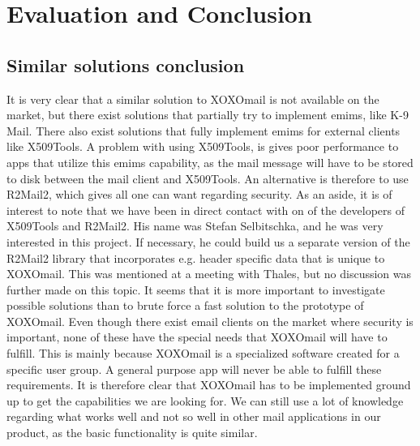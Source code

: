 \section{Evaluation and Conclusion}

\subsection{Similar solutions conclusion}
It is very clear that a similar solution to XOXOmail is not available on the market, but there exist solutions that partially try to implement \gls{emims}, like K-9 Mail. There also exist solutions that fully implement \gls{emims} for external clients like X509Tools. A problem with using X509Tools, is gives poor performance to apps that utilize this \gls{emims} capability, as the mail message will have to be stored to disk between the mail client and X509Tools. An alternative is therefore to use R2Mail2, which gives all one can want regarding security.
\newline
\newline
As an aside, it is of interest to note that we have been in direct contact with on of the developers of X509Tools and R2Mail2. His name was Stefan Selbitschka, and he was very interested in this project. If necessary, he could build us a separate version of the R2Mail2 library that incorporates e.g. header specific data that is unique to XOXOmail. This was mentioned at a meeting with Thales, but no discussion was further made on this topic. It seems that it is more important to investigate possible solutions than to brute force a fast solution to the prototype of XOXOmail.
\newline
\newline
Even though there exist email clients on the market where security is important, none of these have the special needs that XOXOmail will have to fulfill. This is mainly because XOXOmail is a specialized software created for a specific user group. A general purpose app will never be able to fulfill these requirements. It is therefore clear that XOXOmail has to be implemented ground up to get the capabilities we are looking for. We can still use a lot of knowledge regarding what works well and not so well in other mail applications in our product, as the basic functionality is quite similar.

